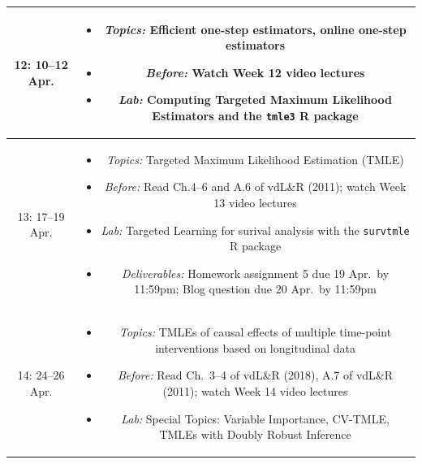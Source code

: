 \documentclass[11pt]{article}
\begin{document}
\begin{table}[H]
\begin{tabular}{ | c | c | }
12: 10--12 Apr. & \begin{minipage}{.85\textwidth}
\begin{itemize} \itemsep-0.4em
  \vspace{1mm}
  \item \textit{Topics:} Efficient one-step estimators, online one-step
    estimators
  \item \textit{Before:} Watch Week 12 video lectures
  \item \textit{Lab:} Computing Targeted Maximum Likelihood Estimators and the
    \texttt{tmle3} R package
  \vspace{1mm}
\end{itemize}
\end{minipage} \\
\hline

13: 17--19 Apr. & \begin{minipage}{.85\textwidth}
\begin{itemize} \itemsep-0.4em
  \vspace{1mm}
  \item \textit{Topics:} Targeted Maximum Likelihood Estimation (TMLE)
  \item \textit{Before:} Read Ch.4--6 and A.6 of vdL\&R (2011); watch Week 13
  video lectures
  \item \textit{Lab:} Targeted Learning for surival analysis with the
    \texttt{survtmle} R package
  \item \textit{Deliverables:} Homework assignment 5 due 19 Apr.~by 11:59pm;
    Blog question due 20 Apr.~by 11:59pm
  \vspace{1mm}
\end{itemize}
\end{minipage} \\
\hline

14: 24--26 Apr. & \begin{minipage}{.85\textwidth}
\begin{itemize} \itemsep-0.4em
  \vspace{1mm}
  \item \textit{Topics:} TMLEs of causal effects of multiple time-point
    interventions based on longitudinal data
  \item \textit{Before:} Read Ch.~3--4 of vdL\&R (2018), A.7 of vdL\&R (2011);
  watch Week 14 video lectures
  \item \textit{Lab:} Special Topics: Variable Importance, CV-TMLE, TMLEs with
    Doubly Robust Inference
  \vspace{1mm}
\end{itemize}
\end{minipage} \\
\hline


\end{tabular}
\end{table}
\end{document}
